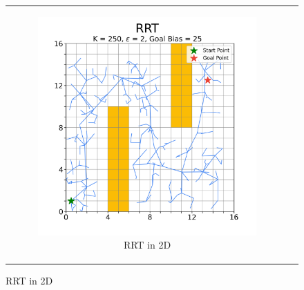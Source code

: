 
\begin{figure}[H]
\begin{centering}
\begin{tabular}{cc}

    \begin{subfigure}{0.5\linewidth}
    \includegraphics[width=\linewidth]{chapters/chapter2/img/visualizing/tree2d.png}
    \caption{RRT in 2D}
    \end{subfigure} &


\end{tabular}
\end{centering}
\end{figure}

